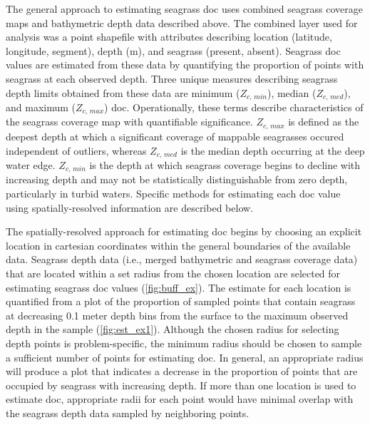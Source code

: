 \documentclass[letterpaper,12pt,oneside]{article}\usepackage[]{graphicx}\usepackage[]{color}
\begin{document}
The general approach to estimating seagrass \acl{doc} uses combined seagrass coverage maps and bathymetric depth data described above.  The combined layer used for analysis was a point shapefile with attributes describing location (latitude, longitude, segment), depth (m), and seagrass (present, absent).  Seagrass \ac{doc} values are estimated from these data by quantifying the proportion of points with seagrass at each observed depth.  Three unique measures describing seagrass depth limits obtained from these data are minimum ($Z_{c,\,min}$), median ($Z_{c,\,med}$), and maximum ($Z_{c,\,max}$) \acl{doc}.  Operationally, these terms describe characteristics of the seagrass coverage map with quantifiable significance. $Z_{c,\,max}$ is defined as the deepest depth at which a significant coverage of mappable seagrasses occured independent of outliers, whereas  $Z_{c,\,med}$ is the median depth occurring at the deep water edge. $Z_{c,\,min}$ is the depth at which seagrass coverage begins to decline with increasing depth and may not be statistically distinguishable from zero depth, particularly in turbid waters. Specific methods for estimating each \ac{doc} value using spatially-resolved information are described below. 

The spatially-resolved approach for estimating \ac{doc} begins by choosing an explicit location in cartesian coordinates within the general boundaries of the available data.  Seagrass depth data (i.e., merged bathymetric and seagrass coverage data) that are located within a set radius from the chosen location are selected for estimating seagrass \ac{doc} values (\cref{fig:buff_ex}). The estimate for each location is quantified from a plot of the proportion of sampled points that contain seagrass at decreasing 0.1 meter depth bins from the surface to the maximum observed depth in the sample (\cref{fig:est_ex1}).  Although the chosen radius for selecting depth points is problem-specific, the minimum radius should be chosen to sample a sufficient number of points for estimating \ac{doc}.  In general, an appropriate radius will produce a plot that indicates a decrease in the proportion of points that are occupied by seagrass with increasing depth. If more than one location is used to estimate \ac{doc}, appropriate radii for each point would have minimal overlap with the seagrass depth data sampled by neighboring points.     
\end{document}
